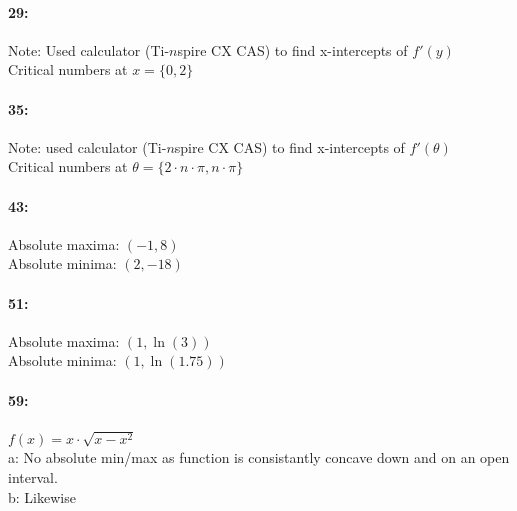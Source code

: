 \documentclass{article}
\begin{document}
    \paragraph*{29:\\}
        Note: Used calculator (Ti-$n$spire CX CAS) to find x-intercepts of \begin {math} f'(y) \end {math} \\
        Critical numbers at \begin{math} x=\{0, 2\} \end {math}\\ 

    \paragraph*{35:\\}
        Note: used calculator (Ti-$n$spire CX CAS) to find x-intercepts of \begin{math} f'(\theta) \end{math} \\
        Critical numbers at \begin{math} \theta=\{2 \cdot n \cdot \pi, n \cdot \pi\} \end{math} \\

    \paragraph*{43:\\}
        Absolute maxima: $(-1, 8)$\\ Absolute minima: $(2, -18)$\\

    \paragraph*{51:\\}
        Absolute maxima: $(1, \ln(3))$\\ Absolute minima: $(1, \ln(1.75))$\\

    \paragraph*{59:\\}
        $f(x) = x\cdot \sqrt{x-x^2}$\\
        a: No absolute min/max as function is consistantly concave down and on an open interval.\\
        b: Likewise
\end{document}
